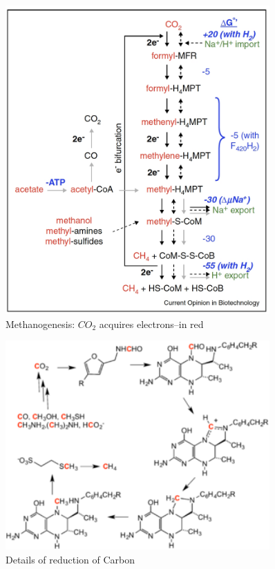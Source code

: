 \documentclass[]{article}
\begin{document}
\begin{figure}[H]
	\caption{Methanogenesis: $CO_2$ acquires electrons--in red} \label{fig:Methanogenesis} 
	\includegraphics[width=0.9\textwidth]{Methanogenesis}
\end{figure}

\begin{figure}[H]
	\caption{Details of reduction of Carbon} \label{fig:320px-Methanogenesis_cycle} 
	\includegraphics[width=0.9\textwidth]{320px-Methanogenesis_cycle}
\end{figure}
\end{document}
